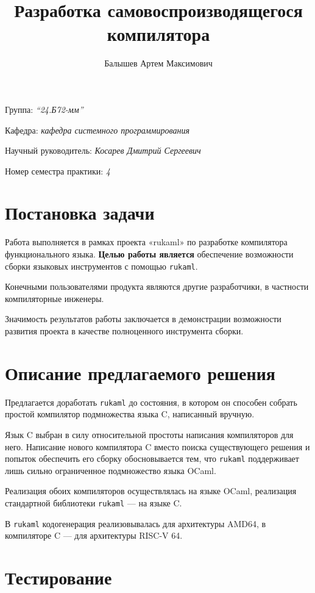\documentclass[a4paper]{article}
\title{Разработка самовоспроизводящегося компилятора}
\author{Балышев Артем Максимович}
\date{}
\begin{document}
\maketitle

\begin{flushright}
    Группа: \emph{\enquote{24.Б72-мм}}

    Кафедра: \emph{кафедра системного программирования}

    Научный руководитель: \emph{Косарев Дмитрий Сергеевич}

    Номер семестра практики: \emph{4}
\end{flushright}


\section{Постановка задачи}

Работа выполняется в рамках проекта «rukaml» по разработке компилятора функционального языка. \textbf{Целью работы является} обеспечение возможности сборки языковых инструментов с помощью \texttt{\large rukaml}.

Конечными пользователями продукта являются другие разработчики, в частности компиляторные инженеры.

Значимость результатов работы заключается в демонстрации возможности развития проекта в качестве полноценного инструмента сборки.

\section{Описание предлагаемого решения}

Предлагается доработать \texttt{\large rukaml} до состояния, в котором он способен собрать простой компилятор подмножества языка C, написанный вручную.


Язык C выбран в силу относительной простоты написания компиляторов для него. Написание нового компилятора C вместо поиска существующего решения и попыток обеспечить его сборку обосновывается тем, что \texttt{\large rukaml} поддерживает лишь сильно ограниченное подмножество языка OCaml.


Реализация обоих компиляторов осуществлялась на языке OCaml, реализация стандартной библиотеки \texttt{\large rukaml} — на языке C.


В \texttt{\large rukaml} кодогенерация реализовывалась для архитектуры AMD64, в компиляторе C — для архитектуры RISC-V 64.


\section{Тестирование}
\end{document}
